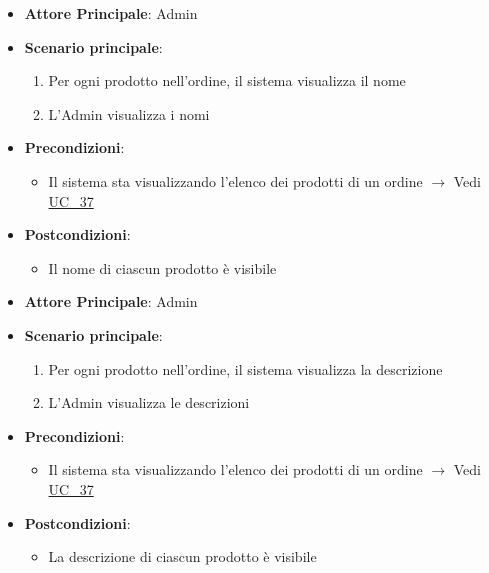 \label{uc_37.2.1}

\begin{itemize}
    \item \textbf{Attore Principale}: Admin
	\item \textbf{Scenario principale}:
	\begin{enumerate}
		\item Per ogni prodotto nell'ordine, il sistema visualizza il nome
		\item L'Admin visualizza i nomi
	\end{enumerate}
	\item \textbf{Precondizioni}:
	\begin{itemize}
		\item Il sistema sta visualizzando l'elenco dei prodotti di un ordine $\rightarrow$ Vedi \hyperref[uc_37]{UC\_37}
	\end{itemize}
	\item \textbf{Postcondizioni}:
	\begin{itemize}
		\item Il nome di ciascun prodotto è visibile
	\end{itemize}
\end{itemize}

\label{uc_37.2.2}

\begin{itemize}
    \item \textbf{Attore Principale}: Admin
	\item \textbf{Scenario principale}:
	\begin{enumerate}
		\item Per ogni prodotto nell'ordine, il sistema visualizza la descrizione
		\item L'Admin visualizza le descrizioni
	\end{enumerate}
	\item \textbf{Precondizioni}:
	\begin{itemize}
		\item Il sistema sta visualizzando l'elenco dei prodotti di un ordine $\rightarrow$ Vedi \hyperref[uc_37]{UC\_37}
	\end{itemize}
	\item \textbf{Postcondizioni}:
	\begin{itemize}
		\item La descrizione di ciascun prodotto è visibile
	\end{itemize}
\end{itemize}


